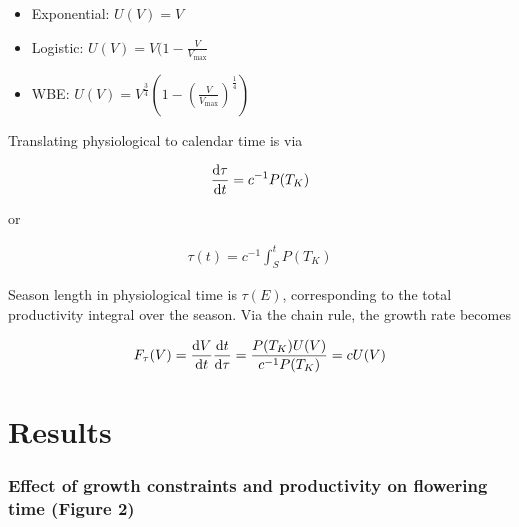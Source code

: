 \documentclass[12pt, oneside]{article}   	%
\begin{document}
\begin{itemize}
\item Exponential: $U(V) = V$
\item Logistic: $U(V) = V(1-\frac{V}{V_\text{max}}$
\item WBE: $U(V) = V^\frac{3}{4} (1-(\frac{V}{V_\text{max}})^{\frac{1}{4}})$
\end{itemize}

Translating physiological to calendar time is via

\begin{align}
\dv{\tau}{t} = c^{-1} P(T_K)
\end{align}

or 

\begin{align}
\tau(t) = c^{-1}  \int_{S}^t P(T_K)
\end{align}

Season length in physiological time is $\tau(E)$, corresponding to the total productivity integral over the season. Via the chain rule, the growth rate becomes

\begin{align}
F_\tau(V) = \dv{V}{t} \dv{t}{\tau} = \frac{P(T_K) U(V)}{c^{-1} P(T_K)} = cU(V)
\end{align}

\section{Results}

\subsubsection{Effect of growth constraints and productivity on flowering time (Figure 2)}
\end{document}
